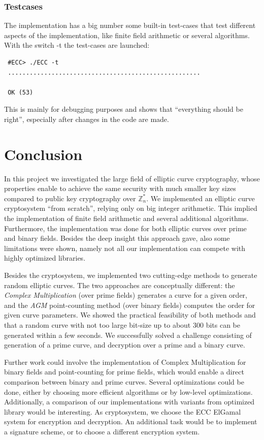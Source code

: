 \documentclass[11pt,english]{article}
\begin{document}
\subsubsection{Testcases}
The implementation has a big number some built-in test-cases that test different aspects of the implementation, like finite field arithmetic or several algorithms. With the switch -t the test-cases are launched:
\begin{verbatim}
 #ECC> ./ECC -t
 .....................................................

 OK (53)
\end{verbatim}
This is mainly for debugging purposes and shows that ``everything should be right'', especially after changes in the code are made.

\section{Conclusion}
In this project we investigated the large field of elliptic curve cryptography, whose properties enable to achieve the same security with much smaller key sizes compared to public key cryptography over $\mathbb{Z}_n^*$. We implemented an elliptic curve cryptosystem ``from scratch'', relying only on big integer arithmetic. This implied the implementation of finite field arithmetic and several additional algorithms. Furthermore, the implementation was done for both elliptic curves over prime and binary fields. Besides the deep insight this approach gave, also some limitations were shown, namely not all our implementation can compete with highly optimized libraries.

Besides the cryptosystem, we implemented two cutting-edge methods to generate random elliptic curves. The two approaches are conceptually different: the \emph{Complex Multiplication} (over prime fields) generates a curve for a given order, and the \emph{AGM} point-counting method (over binary fields) computes the order for given curve parameters. We showed the practical feasibility of both methods and that a random curve with not too large bit-size up to about 300 bits can be generated within a few seconds. We successfully solved a challenge consisting of generation of a prime curve, and decryption over a prime and a binary curve. 

Further work could involve the implementation of Complex Multiplication for binary fields and point-counting for prime fields, which would enable a direct comparison between binary and prime curves. Several optimizations could be done, either by choosing more efficient algorithms or by low-level optimizations. Additionally, a comparison of our implementations with variants from optimized library would be interesting. As cryptosystem, we choose the ECC ElGamal system for encryption and decryption. An additional task would be to implement a signature scheme, or to choose a different encryption system.
\end{document}
